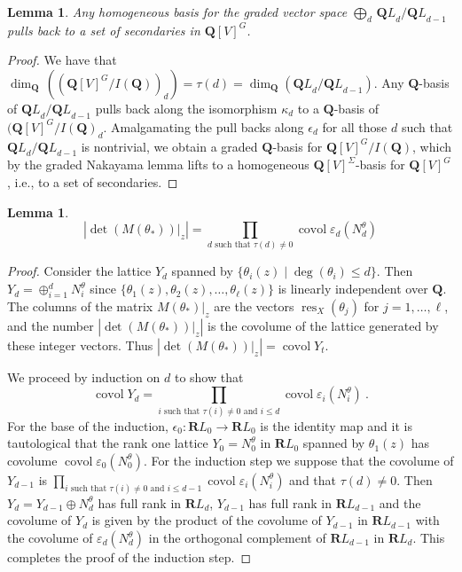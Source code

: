 \documentclass[12pt]{amsart}
\DeclareMathOperator{\res}{res}
\DeclareMathOperator{\cov}{covol}
\renewcommand{\leq}{\leqslant}
\newcommand{\QQ}{\mathbf{Q}} %
\newcommand{\RR}{\mathbf{R}} %
\newcommand{\QQ}{\mathbb{Q}} %
\newcommand{\RR}{\mathbb{R}} %
\newtheorem{lem}[thm]{Lemma}
\theoremstyle{definition}
\newcommand{\bth}{{{\theta_*}}} %
\newcommand{\QL}{{\QQ L}}
\newcommand{\RL}{{\RR L}}
\begin{document}
\begin{lem}\label{lem: lifting}
  Any homogeneous basis for the graded vector 
  space $\bigoplus_d\, {\QL_d}/{\QL_{d-1}}$ pulls back
  to a set of secondaries in $\QQ[V]^G$.
\end{lem}
\begin{proof}
  We have that $\dim_{\QQ}\,((\QQ[V]^G/I(\QQ))_d)=\tau(d)=\dim_{\QQ}(\QL_d/\QL_{d-1}).$
    Any $\QQ$-basis
of $\QL_d/\QL_{d-1}$ pulls back along the isomorphism $\kappa_d$
 to a $\QQ$-basis of $(\QQ[V]^G/I(\QQ)_d$. Amalgamating the pull backs along 
 $\epsilon_d$ for all those
$d$ such that $\QL_d/\QL_{d-1}$ is nontrivial, we obtain a graded $\QQ$-basis
for $\QQ[V]^G/I(\QQ)$, which by the graded Nakayama lemma lifts to a homogeneous
$\QQ[V]^\Sigma$-basis for $\QQ[V]^G$, i.e., to a set of secondaries.
\end{proof}

\begin{lem}\label{lem: covol prod}
    $$|\det(M(\bth))\vert_z| =\prod_{d \text{ such that }\tau(d)\ne 0} \cov \varepsilon_d(N^\theta_d)$$
\end{lem}
\begin{proof} 
 Consider the lattice $Y_d$ spanned by $\{\theta_i(z) \mid \deg(\theta_i)\leq d\}$. 
 Then $Y_d = \oplus_{i=1}^d N_i^\theta$ since $\{\theta_1(z),\theta_2(z),\dots,\theta_\ell(z)\}$ 
 is linearly independent over $\QQ$.
The columns of the matrix $M(\bth)\vert_z$  are the vectors $\res_X(\theta_j)$ for 
$j = 1,\dots,\ell$, and the number $|\det(M(\bth))\vert_z|$ is the covolume of
the lattice generated by these integer vectors.  Thus $|\det(M(\bth))\vert_z|=\cov Y_t$.
 
 We proceed by induction on $d$ to show that 
 $$\cov Y_d = \prod_{i \text{ such that }\tau(i)\ne 0\text{ and } i \leq d} 
 \cov \varepsilon_i(N_i^\theta)\ .$$
 For the base of the induction, $\epsilon_0:\RL_0 \to \RL_0$ is the identity map and 
 it is tautological that the rank one lattice $Y_0=N_0^\theta$ in $\RL_0$
 spanned by $\theta_1(z)$ has covolume $\cov \varepsilon_0(N_0^\theta)$.  
 For the induction step we suppose that the covolume of $Y_{d-1}$ is 
 $\prod_{i \text{ such that }\tau(i)\ne 0\text{ and } i \leq d-1} \cov \varepsilon_i(N^\theta_i)$
 and that $\tau(d) \neq 0$.  Then $Y_d = Y_{d-1} \oplus N^\theta_d$ has full rank in $\RL_d$,
 $Y_{d-1}$ has full rank in $\RL_{d-1}$
 and the covolume of $Y_d$ is given by the product of
 the covolume of $Y_{d-1}$ in $\RL_{d-1}$ with the covolume of $\varepsilon_d(N_d^\theta)$ in 
 the orthogonal complement of $\RL_{d-1}$ in $\RL_d$.  This completes the proof of the induction step. 
\end{proof}
\end{document}
